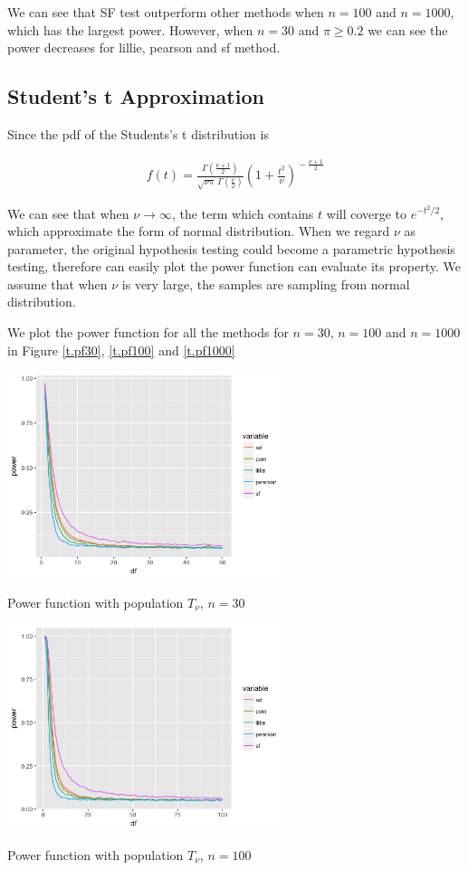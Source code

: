 \documentclass[twoside]{article}
\begin{document}
We can see that SF test outperform other methods when $n=100$ and $n=1000$, which has the largest power. However, when $n=30$ and $\pi \ge 0.2$ we can see the power decreases for lillie, pearson and sf method.

\subsection{Student's t Approximation}

Since the pdf of the Students's t distribution is

\begin{eqnarray}
f(t) = \frac{\Gamma(\frac{\nu+1}{2})} {\sqrt{\nu\pi}\,\Gamma(\frac{\nu}{2})} \left(1+\frac{t^2}{\nu} \right)^{\!-\frac{\nu+1}{2}}
\end{eqnarray}

We can see that when $\nu\to \infty$, the term which contains $t$ will coverge to $e^{-t^2/2}$, which approximate the form of normal distribution. When we regard $\nu$ as parameter, the original hypothesis testing could become a parametric hypothesis testing, therefore can easily plot the power function can evaluate its property. We assume that when $\nu$ is very large, the samples are sampling from normal distribution.

We plot the power function for all the methods for $n=30$, $n=100$ and $n=1000$ in Figure \ref{t.pf30}, \ref{t.pf100} and \ref{t.pf1000}

\begin{center}
\makeatletter
\def\@captype{figure}
\makeatother
\includegraphics [height=6cm]{code/t.30.png}
\caption{Power function with population $T_\nu$, $n=30$}
\label{t.pf30}
\end{center}

\begin{center}
\makeatletter
\def\@captype{figure}
\makeatother
\includegraphics [height=6cm]{code/t.100.png}
\caption{Power function with population $T_\nu$, $n=100$}
\label{t.pf100}
\end{center}
\end{document}
